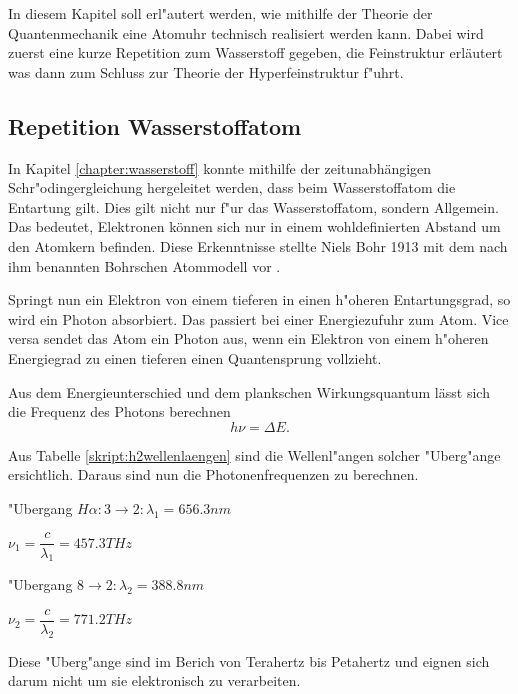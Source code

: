 \begin{refsection}
In diesem Kapitel soll erl"autert werden, wie mithilfe der Theorie der Quantenmechanik eine Atomuhr technisch realisiert werden kann. Dabei wird zuerst eine kurze Repetition zum Wasserstoff gegeben, die Feinstruktur erläutert was dann zum Schluss zur Theorie der Hyperfeinstruktur f"uhrt.

\subsection{Repetition Wasserstoffatom}
In Kapitel \ref{chapter:wasserstoff} konnte mithilfe der zeitunabhängigen Schr"odingergleichung hergeleitet werden, dass beim Wasserstoffatom die Entartung gilt.
Dies gilt nicht nur f"ur das Wasserstoffatom, sondern Allgemein.
Das bedeutet, Elektronen können sich nur in einem wohldefinierten Abstand um den Atomkern befinden. 
Diese Erkenntnisse stellte Niels Bohr 1913 mit dem nach ihm benannten Bohrschen Atommodell vor \cite{wiki:bohr}. 

Springt nun ein Elektron von einem tieferen in einen h"oheren Entartungsgrad, so wird ein Photon absorbiert.
Das passiert bei einer Energiezufuhr zum Atom. 
Vice versa sendet das Atom ein Photon aus, wenn ein Elektron von einem h"oheren Energiegrad zu einen tieferen einen Quantensprung vollzieht.

Aus dem Energieunterschied und dem plankschen Wirkungsquantum lässt sich die Frequenz des Photons berechnen
\begin{equation}
	h\nu = \varDelta E.
\end{equation}

\vspace{.5cm}

Aus Tabelle \ref{skript:h2wellenlaengen} sind die Wellenl"angen solcher "Uberg"ange ersichtlich. Daraus sind nun die Photonenfrequenzen zu berechnen.

\begin{center}
	"Ubergang $H\alpha: 3 \rightarrow 2: \lambda_1 = 656.3nm$

$\nu_1 = \dfrac{c}{\lambda_1} = 457.3 THz $
\vspace{.5cm}

"Ubergang $8 \rightarrow 2: \lambda_2 = 388.8nm$

$\nu_2 = \dfrac{c}{\lambda_2} = 771.2 THz$
\end{center}	

Diese "Uberg"ange sind im Berich von Terahertz bis Petahertz und eignen sich darum nicht um sie elektronisch zu verarbeiten.


\end{refsection}
